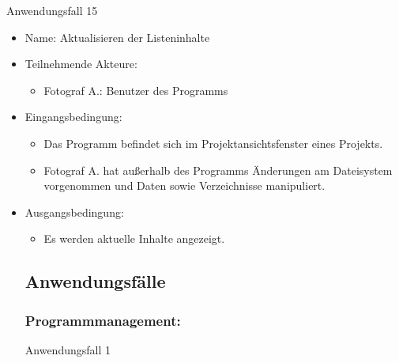 	\begin{description}
		\item[Anwendungsfall 15]
	\end{description}
	
	\begin{itemize}
		\item Name: Aktualisieren der Listeninhalte
		\item Teilnehmende Akteure:
		\begin{itemize}
			\item	Fotograf A.: Benutzer des Programms		
		\end{itemize}
		\item Eingangsbedingung:
		\begin{itemize}
			\item	Das Programm befindet sich im Projektansichtsfenster eines Projekts.
			\item Fotograf A. hat außerhalb des Programms Änderungen am Dateisystem vorgenommen und Daten sowie Verzeichnisse manipuliert.
		\end{itemize}
		\item Ausgangsbedingung:
		\begin{itemize}
			\item	Es werden aktuelle Inhalte angezeigt.	
		\end{itemize}
\subsection{Anwendungsfälle}

	\subsubsection{Programmmanagement:}
	
	\begin{description}
	\item[Anwendungsfall 1]
	\end{description}
	

\end{itemize}
